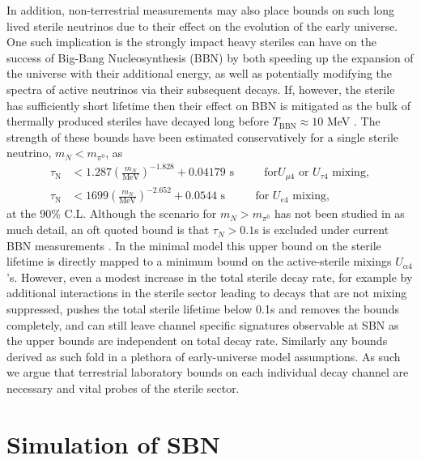 \documentclass[11pt, a4paper]{article}
\begin{document}
In addition, non-terrestrial measurements may also place bounds on such long
lived sterile neutrinos due to their effect on the evolution of the early
universe. One such implication is the strongly impact heavy steriles can have
on the success of Big-Bang Nucleosynthesis (BBN) by both speeding up the
expansion of the universe with their additional energy, as well as potentially
modifying the spectra of active neutrinos via their subsequent decays. If,
however, the sterile has sufficiently short lifetime then their effect on BBN
is mitigated as the bulk of thermally produced steriles have decayed long
before $T_\text{BBN} \approx 10$ MeV \cite{Fields:2006ga}. The strength of
these bounds have been estimated conservatively for a single sterile neutrino,
$m_N < m_{\pi^0}$, as \cite{Dolgov:2000jw,Dolgov:2000pj}
%
\begin{align*} \tau_\text{N} &< 1.287 \left(
\frac{m_N}{\text{MeV}}\right)^{-1.828}+0.04179 \text{  s    $\qquad$  for
$U_{\mu 4}$ or $U_{\tau 4}$ mixing},\\ \tau_\text{N} &< 1699 \left(
\frac{m_N}{\text{MeV}}\right)^{-2.652}+0.0544 \text{  s    $\qquad$  for $U_{e
4}$ mixing}, \end{align*}
%
at the 90\% C.L. Although the scenario for $m_N > m_{\pi^0}$ has not been
studied in as much detail, an oft quoted bound is that $\tau_N > 0.1$s is
excluded under current BBN measurements \cite{Dolgov:2000jw}. In the minimal
model this upper bound on the sterile lifetime is directly mapped to a minimum
bound on the active-sterile mixings $U_{\alpha 4}$'s. However, even a modest
increase in the total sterile decay rate, for example by additional
interactions in the sterile sector leading to decays that are not mixing
suppressed, pushes the total sterile lifetime below 0.1s and removes the bounds
completely, and can still leave channel specific signatures observable at SBN
as the upper bounds are independent on total decay rate. Similarly any bounds
derived as such fold in a plethora of early-universe model assumptions. As such
we argue that terrestrial laboratory bounds on each individual decay channel are necessary
and vital probes of the sterile sector. \\

\section{\label{sec:simulation}Simulation of SBN}

\end{document}
